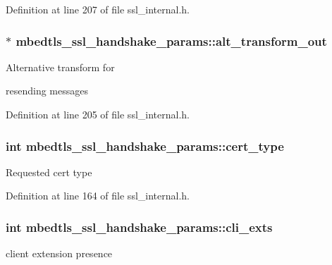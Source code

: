 Definition at line 207 of file ssl\-\_\-internal.\-h.

\hypertarget{structmbedtls__ssl__handshake__params_a398394cd035898f11b9e944bfb50186f}{
\subsubsection[{alt\-\_\-transform\-\_\-out}]{$\ast$ mbedtls\-\_\-ssl\-\_\-handshake\-\_\-params\-::alt\-\_\-transform\-\_\-out}}\label{structmbedtls__ssl__handshake__params_a398394cd035898f11b9e944bfb50186f}
\begin{DoxyVerb}   Alternative transform for
\end{DoxyVerb}
 resending messages 

Definition at line 205 of file ssl\-\_\-internal.\-h.

\hypertarget{structmbedtls__ssl__handshake__params_a7915b5d4d8c7a61b2fa2a8eb6d8d8368}{
\subsubsection[{cert\-\_\-type}]{\setlength{\rightskip}{0pt plus 5cm}int mbedtls\-\_\-ssl\-\_\-handshake\-\_\-params\-::cert\-\_\-type}}\label{structmbedtls__ssl__handshake__params_a7915b5d4d8c7a61b2fa2a8eb6d8d8368}
Requested cert type 

Definition at line 164 of file ssl\-\_\-internal.\-h.

\hypertarget{structmbedtls__ssl__handshake__params_a77de3ed4997da823dbeb52c02728fdc3}{
\subsubsection[{cli\-\_\-exts}]{\setlength{\rightskip}{0pt plus 5cm}int mbedtls\-\_\-ssl\-\_\-handshake\-\_\-params\-::cli\-\_\-exts}}\label{structmbedtls__ssl__handshake__params_a77de3ed4997da823dbeb52c02728fdc3}
client extension presence 

